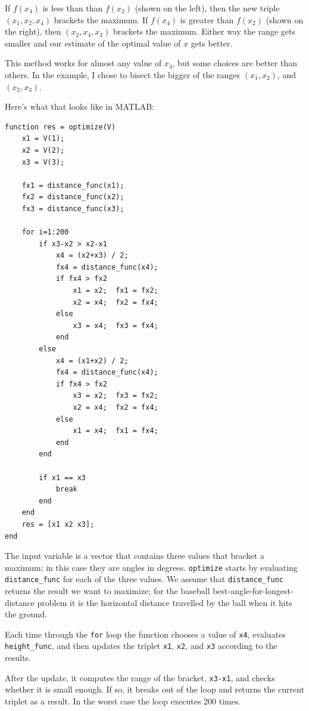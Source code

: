 \documentclass[
]{book}
\begin{document}
If $f(x_4)$ is less than than $f(x_2)$ (shown on the left), then the
new triple $(x_1, x_2, x_4)$ brackets the maximum.  If $f(x_4)$ is
greater than $f(x_2)$ (shown on the right), then $(x_2, x_4, x_3)$
brackets the maximum.  Either way the range gets smaller and our
estimate of the optimal value of $x$ gets better.

This method works for almost any value of $x_4$, but some choices
are better than others.  In the example, I chose to bisect the
bigger of the ranges $(x_1, x_2)$, and $(x_2, x_3)$.

Here's what that looks like in MATLAB:

\begin{verbatim}
function res = optimize(V)
    x1 = V(1);
    x2 = V(2);
    x3 = V(3);

    fx1 = distance_func(x1);
    fx2 = distance_func(x2);
    fx3 = distance_func(x3);

    for i=1:200
        if x3-x2 > x2-x1
            x4 = (x2+x3) / 2;
            fx4 = distance_func(x4);
            if fx4 > fx2
                x1 = x2;  fx1 = fx2;
                x2 = x4;  fx2 = fx4;
            else
                x3 = x4;  fx3 = fx4;
            end
        else
            x4 = (x1+x2) / 2;
            fx4 = distance_func(x4);
            if fx4 > fx2
                x3 = x2;  fx3 = fx2;
                x2 = x4;  fx2 = fx4;
            else
                x1 = x4;  fx1 = fx4;
            end
        end

        if x1 == x3
            break
        end
    end
    res = [x1 x2 x3];
end
\end{verbatim}

The input variable is a vector that contains three values that bracket
a maximum; in this case they are angles in degrees.  {\tt optimize}
starts by evaluating {\tt distance\_func} for each of the three values.
We assume that {\tt distance\_func} returns the result we want to
maximize; for the baseball best-angle-for-longest-distance problem
it is the horizontal distance travelled by the
ball when it hits the ground.


Each time through the {\tt for} loop the function chooses a value
of {\tt x4}, evaluates {\tt height\_func}, and then updates the
triplet {\tt x1}, {\tt x2}, and {\tt x3} according to the results.

After the update, it computes the range of the bracket, {\tt x3-x1},
and checks whether it is small enough.  If so, it breaks out of
the loop and returns the current triplet as a result.  In the
worst case the loop executes 200 times.
\end{document}
